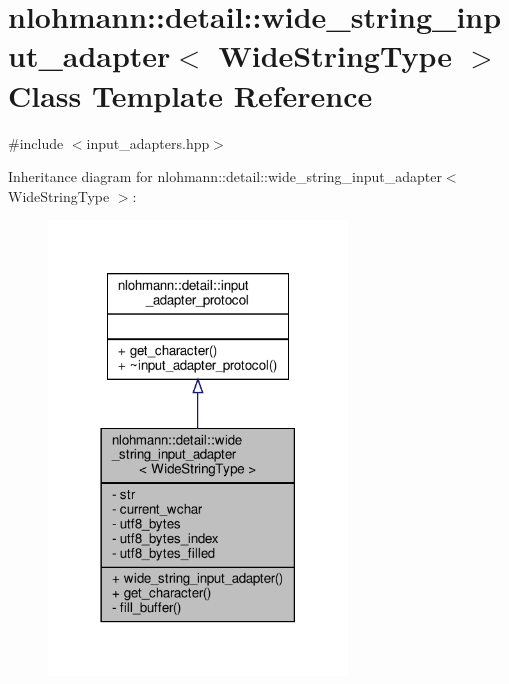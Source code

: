 \hypertarget{classnlohmann_1_1detail_1_1wide__string__input__adapter}{}\section{nlohmann\+:\+:detail\+:\+:wide\+\_\+string\+\_\+input\+\_\+adapter$<$ Wide\+String\+Type $>$ Class Template Reference}
\label{classnlohmann_1_1detail_1_1wide__string__input__adapter}


{\ttfamily \#include $<$input\+\_\+adapters.\+hpp$>$}



Inheritance diagram for nlohmann\+:\+:detail\+:\+:wide\+\_\+string\+\_\+input\+\_\+adapter$<$ Wide\+String\+Type $>$\+:
\nopagebreak
\begin{figure}[H]
\begin{center}
\leavevmode
\includegraphics[width=225pt]{classnlohmann_1_1detail_1_1wide__string__input__adapter__inherit__graph}
\end{center}
\end{figure}


